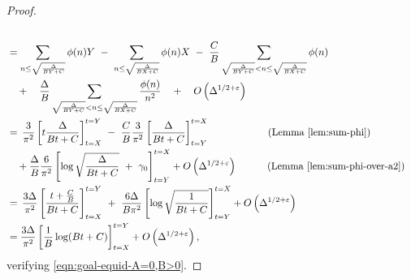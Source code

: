 \documentclass[11pt,letterpaper,reqno]{amsart}
\numberwithin{equation}{section}
\numberwithin{figure}{section}
\numberwithin{table}{section}
\newcommand{\lrp}[1]{\left(#1\right)}
\newcommand{\lrb}[1]{\left[#1\right]}
\begin{document}
\begin{proof}
\begin{align}
{        } \\
        &=  \sum_{n \le \sqrt{\frac{\Delta}{BY+C}}} \phi(n) Y
        ~-~
        \sum_{n \le \sqrt{\frac{\Delta}{BX+C}}} \phi(n) X
        ~-~
        \frac{C}{B} \sum_{\sqrt{\frac{\Delta}{BY+C}} < n \le \sqrt{\frac{\Delta}{BX+C}}} \phi(n)
        \\
        &\quad+\quad
        \frac{\Delta}{B} \sum_{\sqrt{\frac{\Delta}{BY+C}} < n \le \sqrt{\frac{\Delta}{BX+C}}}  \frac{\phi(n)}{n^2}  \quad+\quad O\lrp{\Delta^{1/2+\varepsilon}} \\
        &=\, \frac{3}{\pi^2} \lrb{t\frac{\Delta}{Bt+C}}_{t=X}^{t=Y} 
        ~-~ \frac{C}{B} \frac{3}{\pi^2}
        \lrb{\frac{\Delta}{Bt+C}}_{t=Y}^{t=X}
        \qquad\qquad\quad\ \ \, \text{(Lemma \ref{lem:sum-phi})}
        \\
        &\quad+
        \frac{\Delta}{B} \frac{6}{\pi^2}\lrb{ 
            \log \sqrt{\frac{\Delta}{Bt+C}} ~+~ \gamma_0
        }_{t=Y}^{t=X} + O\lrp{\Delta^{1/2+\varepsilon}} \qquad\quad \text{(Lemma \ref{lem:sum-phi-over-a2})} \\
        &=\, \frac{3\Delta}{\pi^2} \lrb{
            \frac{t+\frac{C}{B}}{Bt+C}
        }_{t=X}^{t=Y}
        ~+~
        \frac{6\Delta}{B\pi^2} \lrb{ 
         \log \sqrt{\frac{1}{Bt+C}} 
        }_{t=Y}^{t=X} + O\lrp{\Delta^{1/2+\varepsilon}} \\
        &= \frac{3\Delta}{\pi^2} \lrb{ 
        \frac1B \log (Bt+C) 
        }_{t=X}^{t=Y} + O\lrp{\Delta^{1/2+\varepsilon}},
    \end{align}
    verifying \eqref{eqn:goal-equid-A=0,B>0}.
\end{proof}
\end{document}
